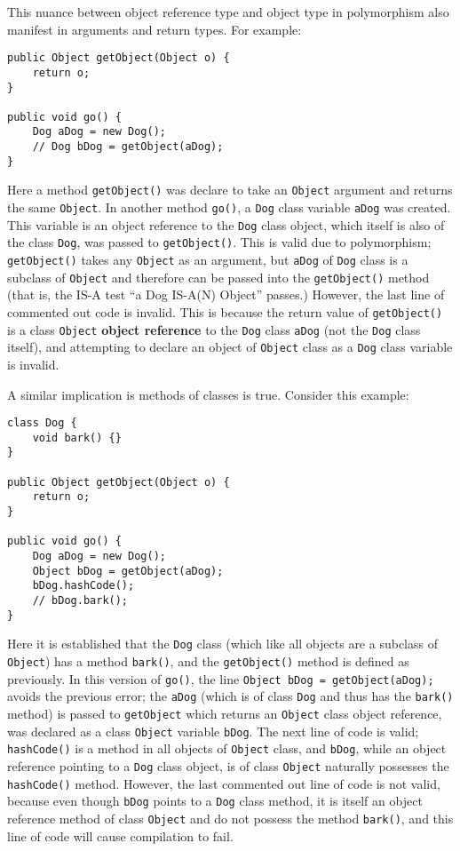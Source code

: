 \documentclass{tufte-handout}
\begin{document}
    This nuance between object reference type and object type in polymorphism also manifest in arguments and return types. For example:

    \begin{lstlisting}
public Object getObject(Object o) {
    return o;
}

public void go() {
    Dog aDog = new Dog();
    // Dog bDog = getObject(aDog);
}
    \end{lstlisting}

    Here a method \texttt{getObject()} was declare to take an \texttt{Object} argument and returns the same \texttt{Object}. In another method \texttt{go()}, a \texttt{Dog} class variable \texttt{aDog} was created. This variable is an object reference to the \texttt{Dog} class object, which itself is also of the class \texttt{Dog}, was passed to \texttt{getObject()}. This is valid due to polymorphism; \texttt{getObject()} takes any \texttt{Object} as an argument, but \texttt{aDog} of \texttt{Dog} class is a subclass of \texttt{Object} and therefore can be passed into the \texttt{getObject()} method (that is, the IS-A test ``a Dog IS-A(N) Object'' passes.) However, the last line of commented out code is invalid. This is because the return value of \texttt{getObject()} is a class \texttt{Object} \textbf{object reference} to the \texttt{Dog} class \texttt{aDog} (not the \texttt{Dog} class itself), and attempting to declare an object of \texttt{Object} class as a \texttt{Dog} class variable is invalid.

    A similar implication is methods of classes is true. Consider this example:

    \begin{lstlisting}
class Dog {
    void bark() {}
}

public Object getObject(Object o) {
    return o;
}

public void go() {
    Dog aDog = new Dog();
    Object bDog = getObject(aDog);
    bDog.hashCode();
    // bDog.bark();
}
    \end{lstlisting}

    Here it is established that the \texttt{Dog} class (which like all objects are a subclass of \texttt{Object}) has a method \texttt{bark()}, and the \texttt{getObject()} method is defined as previously. In this version of \texttt{go()}, the line \texttt{Object bDog = getObject(aDog);} avoids the previous error; the \texttt{aDog} (which is of class \texttt{Dog} and thus has the \texttt{bark()} method) is passed to \texttt{getObject} which returns an \texttt{Object} class object reference, was declared as a class \texttt{Object} variable \texttt{bDog}. The next line of code is valid; \texttt{hashCode()} is a method in all objects of \texttt{Object} class, and \texttt{bDog}, while an object reference pointing to a \texttt{Dog} class object, is of class \texttt{Object} naturally possesses the \texttt{hashCode()} method. However, the last commented out line of code is not valid, because even though \texttt{bDog} points to a \texttt{Dog} class method, it is itself an object reference method of class \texttt{Object} and do not possess the method \texttt{bark()}, and this line of code will cause compilation to fail.
\end{document}
